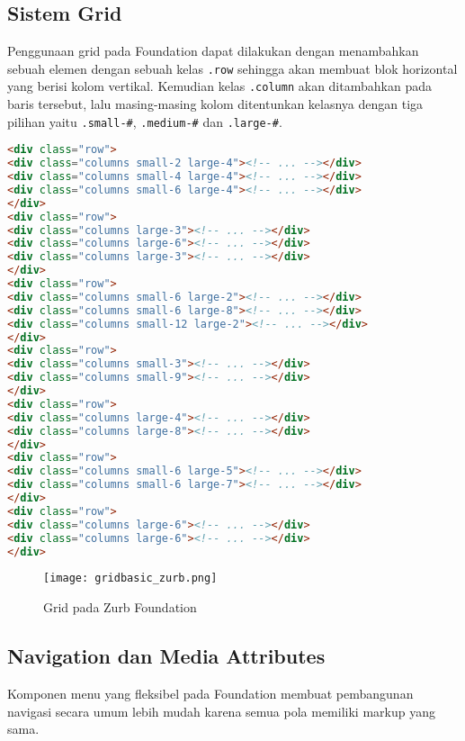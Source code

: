 \subsection{Sistem Grid}
Penggunaan grid pada Foundation dapat dilakukan dengan menambahkan sebuah elemen dengan sebuah kelas \texttt{.row} sehingga akan membuat blok horizontal yang berisi kolom vertikal. Kemudian kelas \texttt{.column} akan ditambahkan pada baris tersebut, lalu masing-masing kolom ditentunkan kelasnya dengan tiga pilihan yaitu 
\texttt{.small-\#}, \texttt{.medium-\#} dan \texttt{.large-\#}.

\begin{lstlisting}[language=HTML,  basicstyle=\ttfamily, frame=single, columns=fullflexible, keepspaces=true, breaklines=true, showstringspaces=false, label={lst:gridFoundation}, caption=Struktur Grid Foundation 6.] 
<div class="row">
<div class="columns small-2 large-4"><!-- ... --></div>
<div class="columns small-4 large-4"><!-- ... --></div>
<div class="columns small-6 large-4"><!-- ... --></div>
</div>
<div class="row">
<div class="columns large-3"><!-- ... --></div>
<div class="columns large-6"><!-- ... --></div>
<div class="columns large-3"><!-- ... --></div>
</div>
<div class="row">
<div class="columns small-6 large-2"><!-- ... --></div>
<div class="columns small-6 large-8"><!-- ... --></div>
<div class="columns small-12 large-2"><!-- ... --></div>
</div>
<div class="row">
<div class="columns small-3"><!-- ... --></div>
<div class="columns small-9"><!-- ... --></div>
</div>
<div class="row">
<div class="columns large-4"><!-- ... --></div>
<div class="columns large-8"><!-- ... --></div>
</div>
<div class="row">
<div class="columns small-6 large-5"><!-- ... --></div>
<div class="columns small-6 large-7"><!-- ... --></div>
</div>
<div class="row">
<div class="columns large-6"><!-- ... --></div>
<div class="columns large-6"><!-- ... --></div>
</div>
\end{lstlisting}

\begin{figure} [H]
	\centering  
	\texttt{[image: gridbasic\_zurb.png]}  
	\caption{Grid pada Zurb Foundation}
	\label{fig:gridFoundation}	 
\end{figure}

\subsection{Navigation dan Media Attributes}
Komponen menu yang fleksibel pada Foundation membuat pembangunan navigasi secara umum lebih mudah karena semua pola memiliki markup yang sama.


